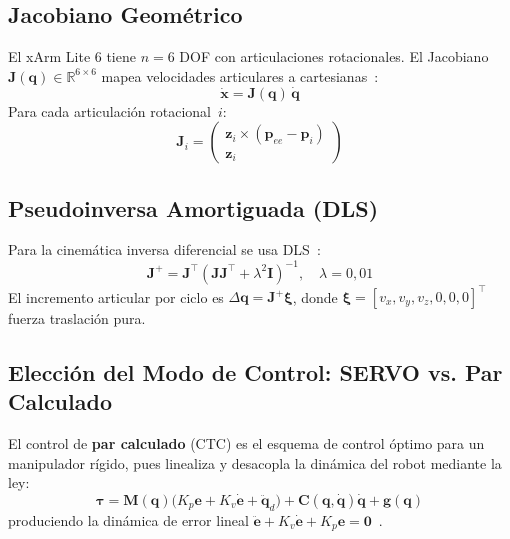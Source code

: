 \documentclass[journal,10pt,twoside]{IEEEtran}
\newcommand{\xarm}{xArm Lite 6}
\begin{document}
\subsection{Jacobiano Geométrico}

El \xarm{} tiene $n=6$ DOF con articulaciones rotacionales.
El Jacobiano $\bm{J}(\bm{q})\in\mathbb{R}^{6\times6}$ mapea
velocidades articulares a cartesianas~\cite{siciliano2009}:
\begin{equation}
  \dot{\bm{x}} = \bm{J}(\bm{q})\,\dot{\bm{q}}
  \label{eq:jacobian}
\end{equation}
Para cada articulación rotacional~$i$:
\begin{equation}
  \bm{J}_i =
  \begin{pmatrix}
    \bm{z}_i \times (\bm{p}_{ee} - \bm{p}_i) \\
    \bm{z}_i
  \end{pmatrix}
  \label{eq:jcol}
\end{equation}

\subsection{Pseudoinversa Amortiguada (DLS)}

Para la cinemática inversa diferencial se usa DLS~\cite{spong2006}:
\begin{equation}
  \bm{J}^{+} = \bm{J}^\top
    \!\left(\bm{J}\bm{J}^\top + \lambda^2\bm{I}\right)^{-1},
  \quad \lambda=0{,}01
  \label{eq:dls}
\end{equation}
El incremento articular por ciclo es $\Delta\bm{q}=\bm{J}^{+}\bm{\xi}$,
donde $\bm{\xi}=[v_x,v_y,v_z,0,0,0]^\top$ fuerza traslación pura.

\subsection{Elección del Modo de Control: SERVO vs. Par Calculado}
\label{sec:ctc}

El control de \textbf{par calculado} (CTC) es el esquema de control
óptimo para un manipulador rígido, pues linealiza y desacopla la dinámica
del robot mediante la ley:
\begin{equation}
  \bm{\tau} = \bm{M}(\bm{q})\bigl(K_p\bm{e}+K_v\dot{\bm{e}}+\ddot{\bm{q}}_d\bigr)
            + \bm{C}(\bm{q},\dot{\bm{q}})\dot{\bm{q}} + \bm{g}(\bm{q})
  \label{eq:ctc}
\end{equation}
produciendo la dinámica de error lineal
$\ddot{\bm{e}} + K_v\dot{\bm{e}} + K_p\bm{e} = \bm{0}$~\cite{siciliano2009}.
\end{document}
